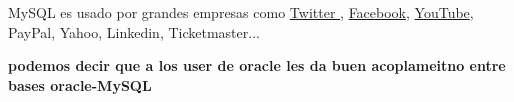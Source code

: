 \documentclass{article}
\begin{document}
MySQL es usado por grandes empresas como 
 \href{https://blog.twitter.com/engineering/en_us/a/2013/new-tweets-per-second-record-and-how.html}{Twitter }, 
\href{https://www.theregister.co.uk/2013/06/27/facebook_tao/}{Facebook},
 \href{http://highscalability.com/blog/2012/3/26/7-years-of-youtube-scalability-lessons-in-30-minutes.html}{YouTube},
  PayPal, Yahoo, Linkedin, Ticketmaster...








\textbf{podemos decir que a los user de oracle les da buen acoplameitno entre bases oracle-MySQL}



\end{document}
